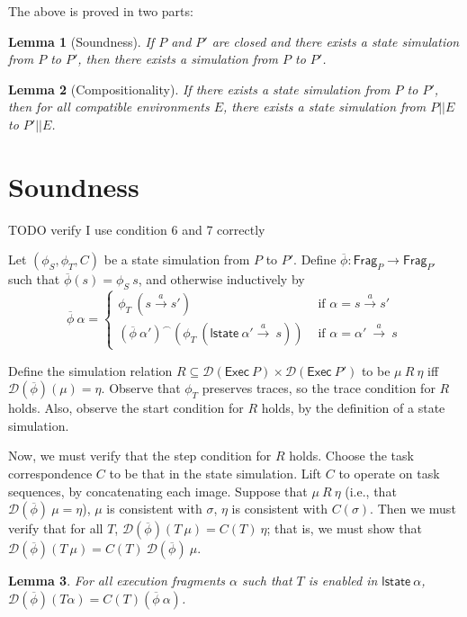 \documentclass{article}
\newcommand{\Exec}{\mathsf{Exec}}
\newcommand{\Frag}{\mathsf{Frag}}
\newcommand{\lst}{\mathsf{lstate}}
\newcommand{\D}{\mathcal{D}}
\newtheorem{lemma}{Lemma}
\begin{document}
The above is proved in two parts:
\begin{lemma}[Soundness]
    If $P$ and $P'$ are closed and there exists a state simulation from $P$ to $P'$, then there exists a simulation from $P$ to $P'$.
\end{lemma}

\begin{lemma}[Compositionality]
    If there exists a state simulation from $P$ to $P'$, then for all compatible environments $E$, there exists a state simulation from $P || E$ to $P' || E$.
\end{lemma}

\section{Soundness}
TODO verify I use condition 6 and 7 correctly

Let $(\phi_S, \phi_T, C)$ be a state simulation from $P$ to $P'$. Define $\overline{\phi} : \Frag_P \to \Frag_{P'}$ such that $\overline{\phi}(s) = \phi_S\ s$, and otherwise inductively by 
\[\overline{\phi}\ \alpha = \begin{cases}
        \phi_T\ (s \xrightarrow{a} s') & \text{ if $\alpha = s \xrightarrow{a} s'$ } \\
        (\overline{\phi}\ \alpha')^\frown (\phi_T\ (\lst\ \alpha' \xrightarrow{a}\ s)) & \text{ if $\alpha = \alpha'\ \xrightarrow{a}\ s$}
    \end{cases} \]

Define the simulation relation $R \subseteq \D(\Exec\ P) \times \D(\Exec\ P')$ to be $\mu\ R\ \eta$ iff $\D(\overline{\phi})(\mu) = \eta$. Observe that $\phi_T$ preserves traces, so the trace condition for $R$ holds. Also, observe the start condition for $R$ holds, by the definition of a state simulation.

Now, we must verify that the step condition for $R$ holds. Choose the task correspondence $C$ to be that in the state simulation. Lift $C$ to operate on task sequences, by concatenating each image. Suppose that $\mu\ R\ \eta$ (i.e., that $\D(\overline{\phi})\ \mu = \eta$), $\mu$ is consistent with $\sigma$, $\eta$ is consistent with $C(\sigma)$. Then we must verify that for all $T$, $\D(\overline{\phi})(T\ \mu) = C(T)\ \eta$; that is, we must show that $\D(\overline{\phi})(T\ \mu) = C(T)\ \D(\overline{\phi})\ \mu$.

\begin{lemma}
    For all execution fragments $\alpha$ such that $T$ is enabled in $\lst\ \alpha$, $\D(\overline{\phi})(T \alpha) = C(T) (\overline{\phi}\ \alpha)$.
\end{lemma}
\end{document}

